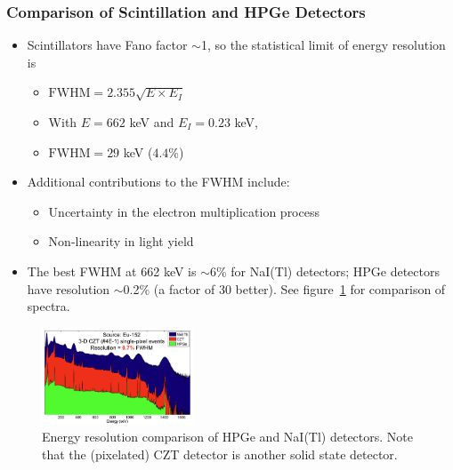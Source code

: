 \subsubsection{Comparison of Scintillation and HPGe Detectors}
\begin{itemize}
    \item Scintillators have Fano factor $\sim$1, so the statistical limit of energy resolution is
    \begin{itemize}
        \item[] $\text{FWHM}=2.355\sqrt{E\times E_I}$
        \item[] With $E=662$ keV and $E_I=0.23$ keV,
        \item[] $\text{FWHM}=29$ keV ($4.4$\%)
    \end{itemize}
    \item Additional contributions to the FWHM include:
    \begin{itemize}
        \item Uncertainty in the electron multiplication process
        \item Non-linearity in light yield
    \end{itemize}
    \item The best FWHM at 662 keV is $\sim$6\% for NaI(Tl) detectors; HPGe detectors have resolution $\sim$0.2\% (a factor of 30 better). See figure~\ref{fig:HPGe_scintillator_comparison} for comparison of spectra. 
\end{itemize}
\begin{figure}[ht]
    \centering
    \includegraphics[width=0.4\textwidth]{images/HPGe_scintillator_comparison.png}
    \caption{Energy resolution comparison of HPGe and NaI(Tl) detectors. Note that the (pixelated) CZT detector is another solid state detector.}
    \label{fig:HPGe_scintillator_comparison}
\end{figure}
